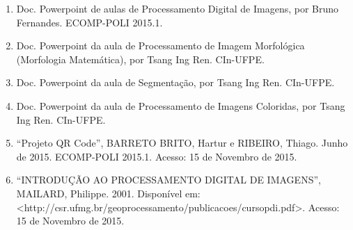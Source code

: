\documentclass{article}
\begin{document}
\begin{enumerate}
        \item Doc. Powerpoint de aulas de Processamento Digital de Imagens, por Bruno Fernandes. ECOMP-POLI 2015.1.
        
        \item Doc. Powerpoint da aula de Processamento de Imagem Morfológica (Morfologia Matemática), por Tsang Ing Ren. CIn-UFPE.
        
        \item Doc. Powerpoint da aula de Segmentação, por Tsang Ing Ren. CIn-UFPE.
        
        \item Doc. Powerpoint da aula de Processamento de Imagens Coloridas, por Tsang Ing Ren. CIn-UFPE.
        
        \item ``Projeto QR Code'', BARRETO BRITO, Hartur e RIBEIRO, Thiago. Junho de 2015. ECOMP-POLI 2015.1. Acesso: 15 de Novembro de 2015.
        
        \item ``INTRODUÇÃO AO PROCESSAMENTO DIGITAL DE IMAGENS'', MAILARD, Philippe. 2001. Disponível em: \textless http://csr.ufmg.br/geoprocessamento/publicacoes/cursopdi.pdf\textgreater. Acesso: 15 de Novembro de 2015.
        
        \end{enumerate}
\end{document}
